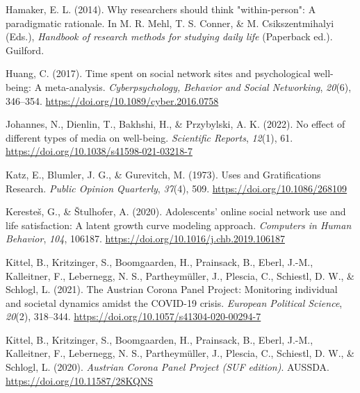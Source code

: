 \documentclass[
  man,mask]{apa7}
\newlength{\cslhangindent}
\newlength{\cslentryspacingunit} %
\newenvironment{CSLReferences}[2] %
 {%
  \setlength{\parindent}{0pt}
  \ifodd #1
  \let\oldpar\par
  \def\par{\hangindent=\cslhangindent\oldpar}
  \fi
  \setlength{\parskip}{#2\cslentryspacingunit}
 }%
 {}
\begin{document}
\begin{CSLReferences}{1}{0}
\leavevmode{}%
Hamaker, E. L. (2014). Why researchers should think "within-person": {A} paradigmatic rationale. In M. R. Mehl, T. S. Conner, \& M. Csikszentmihalyi (Eds.), \emph{Handbook of research methods for studying daily life} (Paperback ed.). {Guilford}.

\leavevmode{}%
Huang, C. (2017). Time spent on social network sites and psychological well-being: {A} meta-analysis. \emph{Cyberpsychology, Behavior and Social Networking}, \emph{20}(6), 346--354. \url{https://doi.org/10.1089/cyber.2016.0758}

\leavevmode{}%
Johannes, N., Dienlin, T., Bakhshi, H., \& Przybylski, A. K. (2022). No effect of different types of media on well-being. \emph{Scientific Reports}, \emph{12}(1), 61. \url{https://doi.org/10.1038/s41598-021-03218-7}

\leavevmode{}%
Katz, E., Blumler, J. G., \& Gurevitch, M. (1973). Uses and {Gratifications Research}. \emph{Public Opinion Quarterly}, \emph{37}(4), 509. \url{https://doi.org/10.1086/268109}

\leavevmode{}%
Keresteš, G., \& Štulhofer, A. (2020). Adolescents' online social network use and life satisfaction: {A} latent growth curve modeling approach. \emph{Computers in Human Behavior}, \emph{104}, 106187. \url{https://doi.org/10.1016/j.chb.2019.106187}

\leavevmode{}%
Kittel, B., Kritzinger, S., Boomgaarden, H., Prainsack, B., Eberl, J.-M., Kalleitner, F., Lebernegg, N. S., Partheymüller, J., Plescia, C., Schiestl, D. W., \& Schlogl, L. (2021). The {Austrian Corona Panel Project}: Monitoring individual and societal dynamics amidst the {COVID-19} crisis. \emph{European Political Science}, \emph{20}(2), 318--344. \url{https://doi.org/10.1057/s41304-020-00294-7}

\leavevmode{}%
Kittel, B., Kritzinger, S., Boomgaarden, H., Prainsack, B., Eberl, J.-M., Kalleitner, F., Lebernegg, N. S., Partheymüller, J., Plescia, C., Schiestl, D. W., \& Schlogl, L. (2020). \emph{Austrian {Corona Panel Project} ({SUF} edition)}. {AUSSDA}. \url{https://doi.org/10.11587/28KQNS}


\end{CSLReferences}
\end{document}
